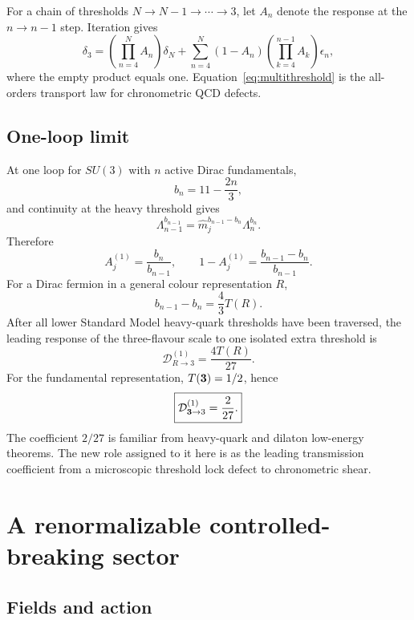\documentclass[11pt,a4paper]{article}
\begin{document}
For a chain of thresholds $N\to N-1\to\cdots\to3$, let $A_n$ denote the response at the $n\to n-1$ step. Iteration gives
\[
\boxed{
\delta_3
=\left(\prod_{n=4}^{N}A_n\right)\delta_N
+\sum_{n=4}^{N}
(1-A_n)
\left(\prod_{k=4}^{n-1}A_k\right)
\epsilon_n,
}
\label{eq:multithreshold}
\]
where the empty product equals one. Equation~\eqref{eq:multithreshold} is the all-orders transport law for chronometric QCD defects.

\subsection{One-loop limit}

At one loop for $SU(3)$ with $n$ active Dirac fundamentals,
\[
b_n=11-\frac{2n}{3},
\]
and continuity at the heavy threshold gives
\[
\Lambda_{n-1}^{b_{n-1}}
=\widehat m_j^{b_{n-1}-b_n}\Lambda_n^{b_n}.
\]
Therefore
\[
A_j^{(1)}=\frac{b_n}{b_{n-1}},
\qquad
1-A_j^{(1)}=\frac{b_{n-1}-b_n}{b_{n-1}}.
\label{eq:oneA}
\]
For a Dirac fermion in a general colour representation $R$,
\[
b_{n-1}-b_n=\frac43T(R).
\]
After all lower Standard Model heavy-quark thresholds have been traversed, the leading response of the three-flavour scale to one isolated extra threshold is
\[
\boxed{
\mathcal D_{R\to3}^{(1)}=\frac{4T(R)}{27}.
}
\label{eq:generalrep}
\]
For the fundamental representation, $T({\bf3})=1/2$, hence
\[
\boxed{
\mathcal D_{{\bf3}\to3}^{(1)}=\frac{2}{27}.
}
\label{eq:two27}
\]
The coefficient $2/27$ is familiar from heavy-quark and dilaton low-energy theorems. The new role assigned to it here is as the leading transmission coefficient from a microscopic threshold lock defect to chronometric shear.

\section{A renormalizable controlled-breaking sector}
\label{sec:breaking}

\subsection{Fields and action}
\end{document}

